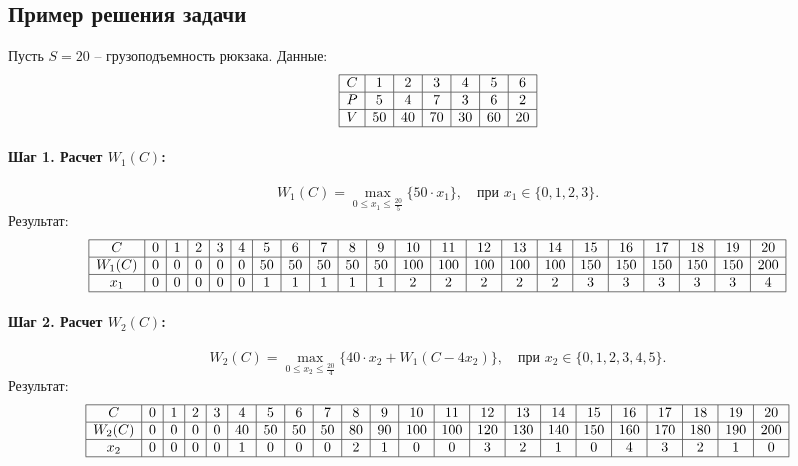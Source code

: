 \documentclass{article}
\begin{document}
\subsection*{Пример решения задачи}
Пусть $S = 20$ -- грузоподъемность рюкзака. Данные:
\[
    \begin{array}{|c|c|c|c|c|c|c|}
        \hline
        C & 1  & 2  & 3  & 4  & 5  & 6  \\
        \hline
        P & 5  & 4  & 7  & 3  & 6  & 2  \\
        \hline
        V & 50 & 40 & 70 & 30 & 60 & 20 \\
        \hline
    \end{array}
\]

\paragraph*{Шаг 1. Расчет $W_1(C)$:}
\[
    W_1(C) = \max_{0 \leq x_1 \leq \frac{20}{5}} \{ 50 \cdot x_1 \}, \quad \text{при } x_1 \in \{0, 1, 2, 3\}.
\]
Результат:
\[
    \begin{array}{|c|c|c|c|c|c|c|c|c|c|c|c|c|c|c|c|c|c|c|c|c|c|}
        \hline
        C      & 0 & 1 & 2 & 3 & 4 & 5  & 6  & 7  & 8  & 9  & 10  & 11  & 12  & 13  & 14  & 15  & 16  & 17  & 18  & 19  & 20  \\
        \hline
        W_1(C) & 0 & 0 & 0 & 0 & 0 & 50 & 50 & 50 & 50 & 50 & 100 & 100 & 100 & 100 & 100 & 150 & 150 & 150 & 150 & 150 & 200 \\
        \hline
        x_1    & 0 & 0 & 0 & 0 & 0 & 1  & 1  & 1  & 1  & 1  & 2   & 2   & 2   & 2   & 2   & 3   & 3   & 3   & 3   & 3   & 4   \\
        \hline
    \end{array}
\]

\paragraph*{Шаг 2. Расчет $W_2(C)$:}
\[
    W_2(C) = \max_{0 \leq x_2 \leq \frac{20}{4}} \{ 40 \cdot x_2 + W_1(C - 4 x_2) \}, \quad \text{при } x_2 \in \{0, 1, 2, 3, 4, 5\}.
\]
Результат:
\[
    \begin{array}{|c|c|c|c|c|c|c|c|c|c|c|c|c|c|c|c|c|c|c|c|c|c|}
        \hline
        C      & 0 & 1 & 2 & 3 & 4  & 5  & 6  & 7  & 8  & 9  & 10  & 11  & 12  & 13  & 14  & 15  & 16  & 17  & 18  & 19  & 20  \\
        \hline
        W_2(C) & 0 & 0 & 0 & 0 & 40 & 50 & 50 & 50 & 80 & 90 & 100 & 100 & 120 & 130 & 140 & 150 & 160 & 170 & 180 & 190 & 200 \\
        \hline
        x_2    & 0 & 0 & 0 & 0 & 1  & 0  & 0  & 0  & 2  & 1  & 0   & 0   & 3   & 2   & 1   & 0   & 4   & 3   & 2   & 1   & 0   \\
        \hline
    \end{array}
\]
\end{document}
